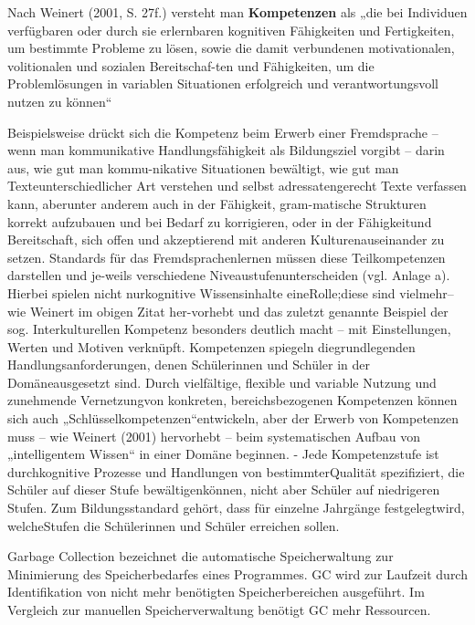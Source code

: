 \documentclass[
12pt,
english,
ngerman,
headsepline,
twoside,
openright,
numbers=noenddot,version=first
]{scrreprt}
\begin{document}
Nach Weinert (2001, S. 27f.) versteht man \textbf{Kompetenzen} als „die bei Individuen verfügbaren oder durch sie erlernbaren kognitiven Fähigkeiten und Fertigkeiten, um bestimmte Probleme zu lösen, sowie die damit verbundenen motivationalen, volitionalen und sozialen Bereitschaf-ten und Fähigkeiten, um die Problemlösungen in variablen Situationen erfolgreich und verantwortungsvoll nutzen zu können“

Beispielsweise drückt sich die Kompetenz beim Erwerb einer Fremdsprache – wenn man kommunikative Handlungsfähigkeit als Bildungsziel vorgibt – darin aus, wie gut man kommu-nikative Situationen bewältigt, wie gut man Texteunterschiedlicher Art verstehen und selbst adressatengerecht Texte verfassen kann, aberunter anderem auch in der Fähigkeit, gram-matische Strukturen korrekt aufzubauen und bei Bedarf zu korrigieren, oder in der Fähigkeitund Bereitschaft, sich offen und akzeptierend mit anderen Kulturenauseinander zu setzen. Standards für das Fremdsprachenlernen müssen diese Teilkompetenzen darstellen und je-weils verschiedene Niveaustufenunterscheiden (vgl. Anlage a). Hierbei spielen nicht nurkognitive Wissensinhalte eineRolle;diese sind vielmehr– wie Weinert im obigen Zitat her-vorhebt und das zuletzt genannte Beispiel der sog. Interkulturellen Kompetenz besonders deutlich macht – mit Einstellungen, Werten und Motiven verknüpft.
Kompetenzen spiegeln diegrundlegenden Handlungsanforderungen, denen Schülerinnen und Schüler in der Domäneausgesetzt sind. Durch vielfältige, flexible und variable Nutzung und zunehmende Vernetzungvon konkreten, bereichsbezogenen Kompetenzen können sich auch „Schlüsselkompetenzen“entwickeln, aber der Erwerb von Kompetenzen muss – wie Weinert (2001) hervorhebt – beim systematischen Aufbau von „intelligentem Wissen“ in einer Domäne beginnen.
- Jede Kompetenzstufe ist durchkognitive Prozesse und Handlungen von bestimmterQualität spezifiziert, die Schüler auf dieser Stufe bewältigenkönnen, nicht aber Schüler auf niedrigeren Stufen. Zum Bildungsstandard gehört, dass für einzelne Jahrgänge festgelegtwird, welcheStufen die Schülerinnen und Schüler erreichen sollen.


\begin{acronym}[Bash]



\glqq Garbage Collection\grqq{} bezeichnet die automatische Speicherwaltung zur Minimierung des Speicherbedarfes eines Programmes.
\ac{GC} wird zur Laufzeit durch Identifikation von nicht mehr benötigten Speicherbereichen ausgeführt.
Im Vergleich zur manuellen Speicherverwaltung benötigt \ac{GC} mehr Ressourcen.

\end{acronym}
\end{document}
